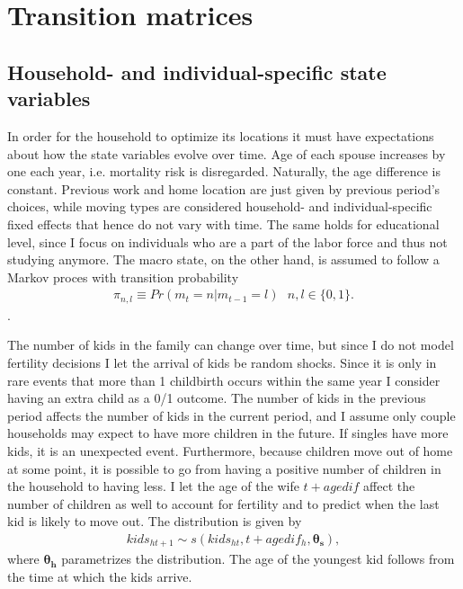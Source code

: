 \section{Transition matrices}
\subsection{Household- and individual-specific state variables}
In order for the household to optimize its locations it must have expectations about how the state variables evolve over time. Age of each spouse increases by one each year, i.e. mortality risk is disregarded. Naturally, the age difference is constant. Previous work and home location are just given by previous period's choices, while moving types are considered household- and individual-specific fixed effects that hence do not vary with time. The same holds for educational level, since I focus on individuals who are a part of the labor force and thus not studying anymore. The macro state, on the other hand, is assumed to follow a Markov proces with transition probability 
\begin{align}
\pi_{n,l}\equiv Pr(m_t=n|m_{t-1}=l)\text{ }n,l\in\{0,1\}. \label{eq:macrodens}
\end{align}.

The number of kids in the family can change over time, but since I do not model fertility decisions I let the arrival of kids be random shocks. Since it is only in rare events that more than 1 childbirth occurs within the same year I consider having an extra child as a 0/1 outcome. The number of kids in the previous period affects the number of kids in the current period, and I assume only couple households may expect to have more children in the future. If singles have more kids, it is an unexpected event. Furthermore, because children move out of home at some point, it is possible to go from having a positive number of children in the household to having less. I let the age of the wife $t+agedif$ affect the number of children as well to account for fertility and to predict when the last kid is likely to move out. The distribution is given by
\begin{align}
kids_{ht+1} \sim s(kids_{ht},t+agedif_h,\boldsymbol{\theta_s}), \label{eq:kidsdens}
\end{align}
where $\boldsymbol{\theta_h}$ parametrizes the distribution. The age of the youngest kid follows from the time at which the kids arrive. 

